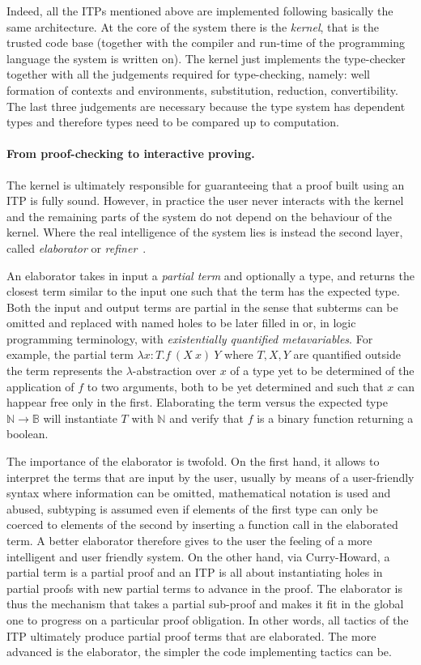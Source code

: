 \documentclass{easychair}
\begin{document}
Indeed, all the ITPs mentioned above are implemented following basically the same architecture. At the core of the system there is the \emph{kernel}, that is the trusted code base (together with the compiler and run-time of the programming language the system is written on). The kernel just implements the type-checker together with all the judgements required for type-checking, namely: well formation of contexts and environments, substitution, reduction, convertibility. The last three judgements are necessary because the type system has dependent types and therefore types need to be compared up to computation.

\paragraph{From proof-checking to interactive proving.}

The kernel is ultimately responsible for guaranteeing that a proof built using an ITP is fully sound. However, in practice the user never interacts with the kernel and the remaining parts of the system do not depend on the behaviour of the kernel. Where the real intelligence of the system lies is instead the second layer, called \emph{elaborator} or \emph{refiner}~\cite{??,??,??}.

An elaborator takes in input a \emph{partial term} and optionally a type, and returns the closest term similar to the input one such that the term has the expected type. Both the input and output terms are partial in the sense that subterms can be omitted and replaced with named holes to be later filled in or, in logic programming terminology, with \emph{existentially quantified metavariables}. For example, the partial term $\lambda x: T. f~(X~x)~Y$ where $T,X,Y$ are quantified outside the term represents the $\lambda$-abstraction over $x$ of a type yet to be determined of the application of $f$ to two arguments, both to be yet determined and such that $x$ can happear free only in the first. Elaborating the term versus the expected type $\mathbb{N} \to \mathbb{B}$ will instantiate $T$ with $\mathbb{N}$ and verify that $f$ is a binary function returning a boolean.

The importance of the elaborator is twofold. On the first hand, it allows to interpret the terms that are input by the user, usually by means of a user-friendly syntax where information can be omitted, mathematical notation is used and abused, subtyping is assumed even if elements of the first type can only be coerced to elements of the second by inserting a function call in the elaborated term. A better elaborator therefore gives to the user the feeling of a more intelligent and user friendly system. On the other hand, via Curry-Howard, a partial term is a partial proof and an ITP is all about instantiating holes in partial proofs with new partial terms to advance in the proof. The elaborator is thus the mechanism that takes a partial sub-proof and makes it fit in the global one to progress on a particular proof obligation. In other words, all tactics of the ITP ultimately produce partial proof terms that are elaborated. The more advanced is the elaborator, the simpler the code implementing tactics can be.
\end{document}
